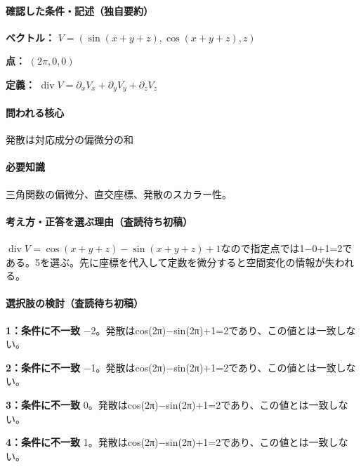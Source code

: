 \paragraph{確認した条件・記述（独自要約）}\mbox{}\par

\noindent\textbf{ベクトル：} \(V=(\sin(x+y+z),\cos(x+y+z),z)\)\par

\noindent\textbf{点：} \((2\pi,0,0)\)\par

\noindent\textbf{定義：} \(\operatorname{div}V=\partial_xV_x+\partial_yV_y+\partial_zV_z\)\par

\paragraph{問われる核心} 発散は対応成分の偏微分の和

\paragraph{必要知識} 三角関数の偏微分、直交座標、発散のスカラー性。

\paragraph{考え方・正答を選ぶ理由（査読待ち初稿）} \(\operatorname{div}V=\cos(x+y+z)-\sin(x+y+z)+1\)なので指定点では1−0+1=\allowbreak{}2である。5を選ぶ。先に座標を代入して定数を微分すると空間変化の情報が失われる。

\paragraph{選択肢の検討（査読待ち初稿）}\mbox{}\par

\noindent\textbf{1：条件に不一致} −2。発散はcos(2π)−sin(2π)+1=\allowbreak{}2であり、この値とは一致しない。\par

\noindent\textbf{2：条件に不一致} −1。発散はcos(2π)−sin(2π)+1=\allowbreak{}2であり、この値とは一致しない。\par

\noindent\textbf{3：条件に不一致} 0。発散はcos(2π)−sin(2π)+1=\allowbreak{}2であり、この値とは一致しない。\par

\noindent\textbf{4：条件に不一致} 1。発散はcos(2π)−sin(2π)+1=\allowbreak{}2であり、この値とは一致しない。\par

